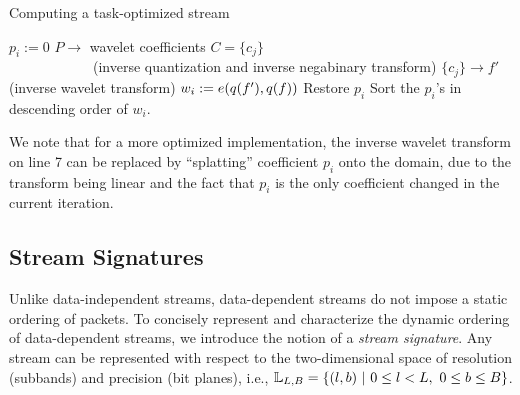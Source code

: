 \vspace{-0.5em}
\begin{algorithm}[h]
  \caption{Computing a task-optimized stream}
  \begin{algorithmic}[1]
			\State $p_i := 0$
      \State $P \rightarrow$ wavelet coefficients $C=\{c_j\}$\\
      		\ \ \ \ \ \ \ \ \ \ \ \ (inverse quantization and inverse negabinary transform)
			\State $\{c_j\} \rightarrow f'$ (inverse wavelet transform)
			\State $w_i := e(q(f'),q(f))$			
			\State Restore $p_i$
		\EndFor
		\State Sort the $p_i$'s in descending order of $w_i$.
	\end{algorithmic}
	\label{alg:greedy}
\end{algorithm}

\vspace{-0.5em}
We note that for a more optimized implementation, the inverse wavelet transform on line 7 can be
replaced by ``splatting'' coefficient $p_i$ onto the domain, due to the transform being linear and
the fact that $p_i$ is the only coefficient changed in the current iteration.

\subsection{Stream Signatures} \label{sec:stream-signature}

Unlike data-independent streams, data-dependent streams do not impose a static ordering of packets.
To concisely represent and characterize the dynamic ordering of data-dependent streams, we introduce
the notion of a \emph{stream signature}. Any stream can be represented with respect to the
two-dimensional space of resolution (subbands) and precision (bit
planes), i.e., \mbox{${\mathbb L}_{L,B}=\{(l,b)\ |\ 0\leq l < L,\ 0\leq b \leq B\}$.}

